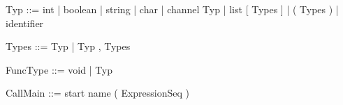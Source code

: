 \documentclass[11pt]{report}
\begin{document}
\begin{verbnobox}[\normalfont]
Typ ::= int
      | boolean
      | string
      | char
      | channel Typ
      | list [ Types ]
      | ( Types )
      | identifier
\end{verbnobox}
\vspace*{3pt}

\begin{verbnobox}[\normalfont]
Types ::= Typ | Typ , Types
\end{verbnobox}
\vspace*{3pt}

\begin{verbnobox}[\normalfont]
FuncType ::= void | Typ
\end{verbnobox}
\vspace*{3pt}

\begin{verbnobox}[\normalfont]
CallMain ::= start name ( ExpressionSeq )
\end{verbnobox}
\vspace*{3pt}
\end{document}
